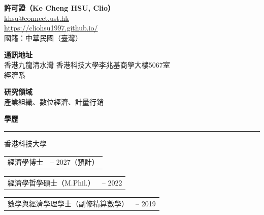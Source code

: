 \documentclass[11pt,letterpaper]{article}
\makeatletter
\newlength{\cvdatecol}
\newcommand{\sectionheader}[1]{%
  \vspace{0.55em}
  {\large\bfseries #1}\\[-0.15em]
  \rule{\textwidth}{0.4pt}\par
  \vspace{0.25em}
}
\newcommand{\cvline}[3][0em]{%
  \par\nobreak
  \noindent\hspace*{#1}%
  \begin{tabularx}{\dimexpr\textwidth-#1\relax}{@{}X@{\hspace{0.75em}}>{\raggedleft\arraybackslash}p{\cvdatecol}@{}}
  #2 & #3 \\
  \end{tabularx}%
}
\makeatother
\begin{document}
\begin{center}
{\LARGE\bfseries 許可證（Ke Cheng HSU, Clio）}\\[0.55em]
\href{mailto:khsu@connect.ust.hk}{khsu@connect.ust.hk}\\[0.2em]
\href{https://cliohsu1997.github.io}{https://cliohsu1997.github.io/}\\[0.2em]
國籍：中華民國（臺灣）
\end{center}

\vspace{0.7em}

\textbf{通訊地址}\\[0.2em]
\hspace{1.5em} 香港九龍清水灣 香港科技大學李兆基商學大樓5067室\\
\hspace{1.5em} 經濟系

\vspace{0.55em}

\textbf{研究領域}\\[0.2em]
\hspace{1.5em} 產業組織、數位經濟、計量行銷

\sectionheader{學歷}
{
香港科技大學\\[-0.35em]
\cvline[1.5em]{經濟學博士}{2022 -- 2027（預計）}
\vspace{-0.15em}
\cvline[1.5em]{經濟學哲學碩士（M.Phil.）}{2020 -- 2022}
\vspace{-0.15em}
\cvline[1.5em]{數學與經濟學理學士（副修精算數學）}{2015 -- 2019}
}
\end{document}
